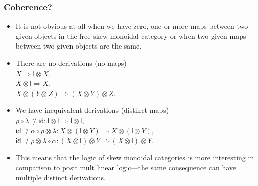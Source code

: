 \documentclass[10pt,t]{beamer}
\newcommand{\I}{\mathsf{I}}
\newcommand{\ot}{\otimes}
\newcommand{\al}{\alpha}
\newcommand{\lam}{\lambda}
\newcommand{\tto}{\Longrightarrow}
\newcommand{\id}{\mathsf{id}}
\newcommand{\comp}{\circ}
\begin{document}
\begin{frame}

\frametitle{Coherence?}

\begin{itemize}

\item It is not obvious at all when we have zero, one or more maps
  between two given objects in the free skew monoidal category or when
  two given maps between two given objects are the same.

\bigskip

\item There are no derivations (no maps) \\[6pt]

 $X \tto \I \ot X$, \\ 

 $X \ot \I \tto X$, \\

 $X \ot (Y \ot Z) \tto (X \ot Y) \ot Z$.

\medskip

\item We have inequivalent derivations (distinct maps) \\[6pt]

 $\rho \comp \lam \not\doteq \id : \I \ot \I \tto \I \ot \I$, \\

 $\id \not\doteq \al \comp  \rho \ot \lam : 
 X \ot (\I \ot Y) \tto X \ot (\I \ot Y) $, \\

 $\id \not\doteq \rho \ot \lam \comp \al :
 (X \ot \I) \ot Y \tto (X \ot \I) \ot Y$.

\bigskip


\item This means that the logic of skew monoidal categories is more
  interesting in comparison to posit mult linear logic---the same
  consequence can have multiple distinct derivations.

\end{itemize}

\end{frame}
\end{document}
